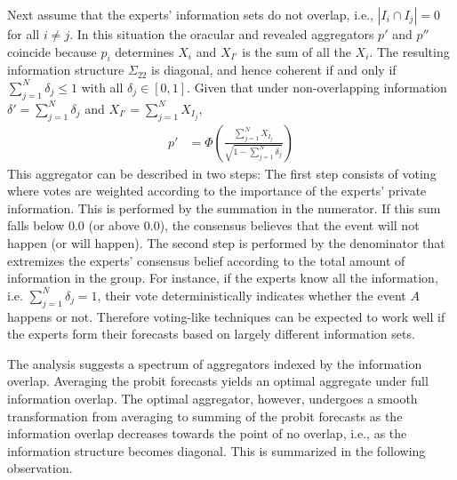 \documentclass[11pt]{article}
\theoremstyle{definition}
\theoremstyle{definition}
\begin{document}
Next assume that the experts' information sets do not overlap, 
i.e., $|I_{i} \cap I_{j}| = 0$ for all $i \neq j$. 
In this situation the oracular and revealed aggregators $p'$ and $p''$
coincide because $p_i$ determines $X_i$ and $X_{I'}$ is the sum of
all the $X_i$.  The resulting information structure $\Sigma_{22}$ 
is diagonal, and hence coherent if and only if $\sum_{j=1}^N \delta_j \leq 1$ 
with all $\delta_j \in [0,1]$.  Given that under non-overlapping information 
$\delta' = \sum_{j=1}^N \delta_j$ and $X_{I'} = \sum_{j=1}^N X_{I_j}$, 
 \begin{align}
p' &= \Phi\left( \frac{\sum_{j=1}^N X_{I_j}}
  {\sqrt{1- \sum_{j=1}^N \delta_j}} \right) \label{vote}
\end{align}
This aggregator can be described in two steps: The first step consists of voting where votes are weighted according to the importance of the experts' private information. This is performed by the summation in the numerator. If this sum falls below $0.0$ (or above $0.0$), the consensus believes that the event will not happen (or will happen). The second step is performed by the denominator that extremizes the experts'  consensus belief according to the total amount of information in the group. For instance, if the experts know all the information, i.e. $\sum_{j=1}^N \delta_j = 1$, their vote deterministically indicates whether the event $A$ happens or not.  Therefore voting-like techniques can be expected to work well if the experts form their forecasts based on largely different information sets. 

The analysis suggests a spectrum of aggregators indexed by the 
information overlap.  Averaging the probit forecasts yields an 
optimal aggregate under full information overlap.  The optimal 
aggregator, however, undergoes a smooth transformation from 
averaging to summing of the probit forecasts as the information 
overlap decreases towards the point of no overlap, i.e., as the 
information structure becomes diagonal.  This is summarized in the following observation.
\end{document}

